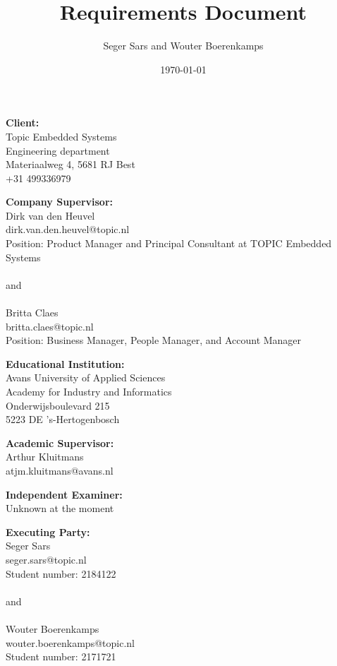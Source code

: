 \documentclass{article}
\title{Requirements Document}
\author{Seger Sars and Wouter Boerenkamps}
\date{\today}
\begin{document}
\maketitle

\newpage

\noindent \textbf{Client:}\\
Topic Embedded Systems\\
Engineering department\\
Materiaalweg 4, 5681 RJ Best\\
+31 499336979\\

\vspace{1em}

\noindent \textbf{Company Supervisor:}\\
Dirk van den Heuvel\\
dirk.van.den.heuvel@topic.nl\\
Position: Product Manager and Principal Consultant at TOPIC Embedded Systems\\
\\
and\\
\\
Britta Claes\\
britta.claes@topic.nl\\
Position: Business Manager, People Manager, and Account Manager

\vspace{1em}

\noindent \textbf{Educational Institution:}\\
Avans University of Applied Sciences\\
Academy for Industry and Informatics\\
Onderwijsboulevard 215\\
5223 DE 's-Hertogenbosch

\vspace{1em}

\noindent \textbf{Academic Supervisor:}\\
Arthur Kluitmans\\
atjm.kluitmans@avans.nl

\vspace{1em}

\noindent \textbf{Independent Examiner:}\\
Unknown at the moment

\vspace{1em}

\noindent \textbf{Executing Party:}\\
Seger Sars\\
seger.sars@topic.nl\\
Student number: 2184122\\
\\
and\\
\\
Wouter Boerenkamps\\
wouter.boerenkamps@topic.nl\\
Student number: 2171721
\end{document}
